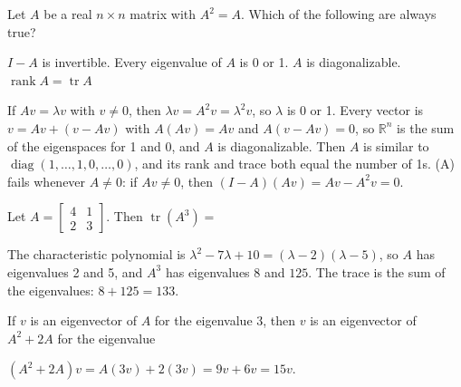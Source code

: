 \begin{question}[id=eig-14, type=msq, marks=2]
Let $A$ be a real $n \times n$ matrix with $A^2 = A$. Which of the following are always true?
\begin{options}
  \option $I - A$ is invertible.
  \correct Every eigenvalue of $A$ is 0 or 1.
  \correct $A$ is diagonalizable.
  \correct $\operatorname{rank} A = \operatorname{tr} A$
\end{options}
\begin{solution}
If $Av = \lambda v$ with $v \ne 0$, then $\lambda v = A^2v = \lambda^2 v$, so $\lambda$ is 0 or 1. Every vector is $v = Av + (v - Av)$ with $A(Av) = Av$ and $A(v - Av) = 0$, so $\mathbb{R}^n$ is the sum of the eigenspaces for 1 and 0, and $A$ is diagonalizable. Then $A$ is similar to $\operatorname{diag}(1, \dots, 1, 0, \dots, 0)$, and its rank and trace both equal the number of 1s. (A) fails whenever $A \ne 0$: if $Av \ne 0$, then $(I - A)(Av) = Av - A^2v = 0$.
\end{solution}
\end{question}

\begin{question}[id=eig-15, marks=2]
Let $A = \begin{bmatrix} 4 & 1 \\ 2 & 3 \end{bmatrix}$. Then $\operatorname{tr}(A^3) =$
\begin{solution}
The characteristic polynomial is $\lambda^2 - 7\lambda + 10 = (\lambda - 2)(\lambda - 5)$, so $A$ has eigenvalues 2 and 5, and $A^3$ has eigenvalues $8$ and $125$. The trace is the sum of the eigenvalues: $8 + 125 = 133$.
\end{solution}
\end{question}

\begin{question}[id=eig-16]
If $v$ is an eigenvector of $A$ for the eigenvalue 3, then $v$ is an eigenvector of $A^2 + 2A$ for the eigenvalue
\begin{options}
\end{options}
\begin{solution}
$(A^2 + 2A)v = A(3v) + 2(3v) = 9v + 6v = 15v$.
\end{solution}
\end{question}

